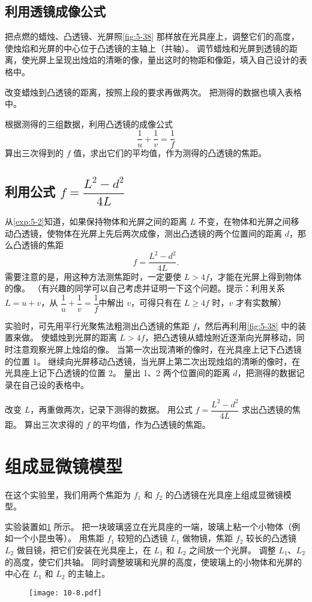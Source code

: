 \subsection{利用透镜成像公式}

把点燃的蜡烛、凸透镜、光屏照\cref{fig:5-38} 那样放在光具座上，调整它们的高度，使烛焰和光屏的中心位于凸透镜的主轴上（共轴）。
调节蜡烛和光屏到透镜的距离，使光屏上呈现出烛焰的清晰的像，量出这时的物距和像距，填入自己设计的表格中。

改变蜡烛到凸透镜的距离，按照上段的要求再做两次。
把测得的数据也填入表格中。

根据测得的三组数据，利用凸透镜的成像公式
\[\frac{1}{u}+\frac{1}{v}=\frac{1}{f}\]
算出三次得到的 $f$ 值，求出它们的平均值，作为测得的凸透镜的焦距。

\subsection{利用公式 \texorpdfstring{$f=\dfrac{L^2-d^2}{4L}$}{f=(L2-d2)/4L}}

从\cref{exp:5-2}知道，如果保持物体和光屏之间的距离 $L$ 不变，在物体和光屏之间移动凸透镜，使物体在光屏上先后两次成像，测出凸透镜的两个位置间的距离 $d$，那么凸透镜的焦距
\[f=\dfrac{L^2-d^2}{4L}.\]
需要注意的是，用这种方法测焦距时，一定要使 $L>4f$，才能在光屏上得到物体的像。
（有兴趣的同学可以自己考虑并证明一下这个问题。提示：利用关系 $L=u+v$，从 $\dfrac{1}{u}+\dfrac{1}{v}=\dfrac{1}{f}$中解出 $v$，可得只有在 $L \geqslant 4f$ 时，$v$ 才有实数解）

实验时，可先用平行光聚焦法粗测出凸透镜的焦距 $f$，然后再利用\cref{fig:5-38} 中的装置来做。
使蜡烛到光屏的距离 $L>4f$，把凸透镜从蜡烛附近逐渐向光屏移动，同时注意观察光屏上烛焰的像。
当第一次出现清晰的像时，在光具座上记下凸透镜的位置 1。
继续向光屏移动凸透镜，当光屏上第二次出现烛焰的清晰的像时，在光具座上记下凸透镜的位置 2。
量出 1、2 两个位置间的距离 $d$，把测得的数据记录在自己设的表格中。

改变 $L$，再重做两次，记录下测得的数据。
用公式 $f=\dfrac{L^2-d^2}{4L}$ 求出凸透镜的焦距。
算出三次求得的 $f$ 的平均值，作为凸透镜的焦距。

\section{组成显微镜模型}
在这个实验里，我们用两个焦距为 $f_1$ 和 $f_2$ 的凸透镜在光具座上组成显微镜模型。

实验装置如\cref{fig:10-8} 所示。
把一块玻璃竖立在光具座的一端，玻璃上粘一个小物体（例如一个小昆虫等）。
用焦距 $f_1$ 较短的凸透镜 $L_1$ 做物镜，焦距 $f_2$ 较长的凸透镜 $L_2$ 做目镜，把它们安装在光具座上，在 $L_1$ 和 $L_2$ 之间放一个光屏。
调整 $L_1$、$L_2$ 的高度，使它们共轴。
同时调整玻璃和光屏的高度，使玻璃上的小物体和光屏的中心在 $L_1$ 和 $L_2$ 的主轴上。
\begin{figure}
  \texttt{[image: 10-8.pdf]}
  \caption{}\label{fig:10-8}
\end{figure}

